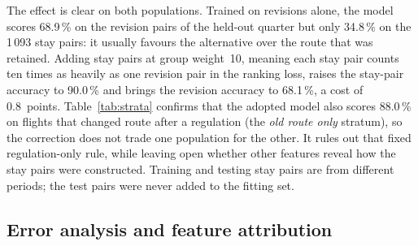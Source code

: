 \documentclass[conference,10pt,a4paper,IEEEoverridecommandlockouts]{IEEEtran}
\begin{document}
The effect is clear on both populations. Trained on revisions alone, the
model scores 68.9\,\% on the revision pairs of the held-out quarter but
only 34.8\,\% on the 1\,093 stay pairs: it usually favours the
alternative over the route that was retained. Adding stay pairs
at group weight~10, meaning each stay pair counts ten times as heavily as
one revision pair in the ranking loss, raises the stay-pair accuracy to
90.0\,\% and brings the revision accuracy to 68.1\,\%, a cost of
0.8~points.
Table~\ref{tab:strata} confirms that the adopted model also scores
88.0\,\% on flights that changed route after a regulation (the
\emph{old route only} stratum), so the correction does not trade one
population for the other. It rules out that fixed regulation-only rule,
while leaving open whether other features reveal how the stay pairs were
constructed. Training and testing stay pairs are from different periods;
the test pairs were never added to the fitting set.

\subsection{Error analysis and feature attribution}
\end{document}
